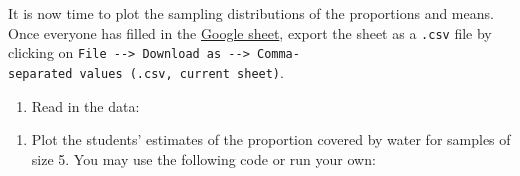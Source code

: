 \documentclass[letterpaper,12pt,twoside,]{pinp}
\providecommand{\tightlist}{%
  \setlength{\itemsep}{0pt}\setlength{\parskip}{0pt}}
\begin{document}
It is now time to plot the sampling distributions of the proportions and
means. Once everyone has filled in the
\href{https://docs.google.com/spreadsheets/d/1Mnxeq9nQcTdQycZ7S_62fYFiNC5_a3fibsyodzfwO58/edit?usp=sharing}{Google
sheet}, export the sheet as a \texttt{.csv} file by clicking on
\texttt{File\ -\/-\textgreater{}\ Download\ as\ -\/-\textgreater{}\ Comma-separated\ values\ (.csv,\ current\ sheet)}.

\begin{enumerate}
\def\labelenumi{\arabic{enumi}.}
\tightlist
\item
  Read in the data:
\end{enumerate}

\begin{Shaded}
\begin{Highlighting}[]
\StringTok{ }\NormalTok{(}\NormalTok{, }\NormalTok{)}
\StringTok{ }\NormalTok{water_results[,}\OperatorTok{:}\NormalTok{]}
\StringTok{ }\NormalTok{water_results[}\NormalTok{(water_results), ]}

\StringTok{ }
\end{Highlighting}
\end{Shaded}

\begin{enumerate}
\def\labelenumi{\arabic{enumi}.}
\setcounter{enumi}{1}
\tightlist
\item
  Plot the students' estimates of the proportion covered by water for
  samples of size 5. You may use the following code or run your own:
\end{enumerate}

\begin{Shaded}
\begin{Highlighting}[]
\NormalTok{(}\NormalTok{(water_results[,}\NormalTok{]), }
      \NormalTok{(}\NormalTok{,}\NormalTok{),}
      \NormalTok{,}
      \NormalTok{, }
      \NormalTok{(}\OperatorTok{/}\NormalTok{), }
      \NormalTok{)}
\end{Highlighting}
\end{Shaded}
\end{document}
